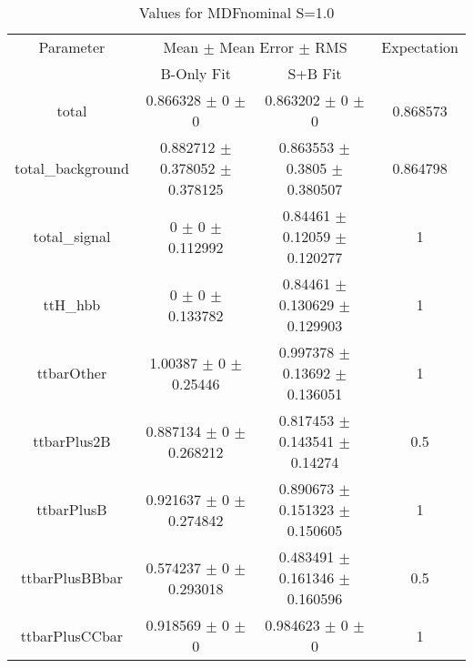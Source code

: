 \begin{table}
\centering
\caption{Values for MDFnominal S=1.0}
\begin{tabular}{cccc}
\toprule
Parameter & \multicolumn{2}{c}{Mean $\pm$ Mean Error $\pm$ RMS} & Expectation\\
 & B-Only Fit & S+B Fit & \\
\midrule
total & \num{0.866328} $\pm$ \num{0} $\pm$ \num{0} & \num{0.863202} $\pm$ \num{0} $\pm$ \num{0} & \num{0.868573}\\
total\_background & \num{0.882712} $\pm$ \num{0.378052} $\pm$ \num{0.378125} & \num{0.863553} $\pm$ \num{0.3805} $\pm$ \num{0.380507} & \num{0.864798}\\
total\_signal & \num{0} $\pm$ \num{0} $\pm$ \num{0.112992} & \num{0.84461} $\pm$ \num{0.12059} $\pm$ \num{0.120277} & \num{1}\\
ttH\_hbb & \num{0} $\pm$ \num{0} $\pm$ \num{0.133782} & \num{0.84461} $\pm$ \num{0.130629} $\pm$ \num{0.129903} & \num{1}\\
ttbarOther & \num{1.00387} $\pm$ \num{0} $\pm$ \num{0.25446} & \num{0.997378} $\pm$ \num{0.13692} $\pm$ \num{0.136051} & \num{1}\\
ttbarPlus2B & \num{0.887134} $\pm$ \num{0} $\pm$ \num{0.268212} & \num{0.817453} $\pm$ \num{0.143541} $\pm$ \num{0.14274} & \num{0.5}\\
ttbarPlusB & \num{0.921637} $\pm$ \num{0} $\pm$ \num{0.274842} & \num{0.890673} $\pm$ \num{0.151323} $\pm$ \num{0.150605} & \num{1}\\
ttbarPlusBBbar & \num{0.574237} $\pm$ \num{0} $\pm$ \num{0.293018} & \num{0.483491} $\pm$ \num{0.161346} $\pm$ \num{0.160596} & \num{0.5}\\
ttbarPlusCCbar & \num{0.918569} $\pm$ \num{0} $\pm$ \num{0} & \num{0.984623} $\pm$ \num{0} $\pm$ \num{0} & \num{1}\\
\bottomrule
\end{tabular}
\end{table}